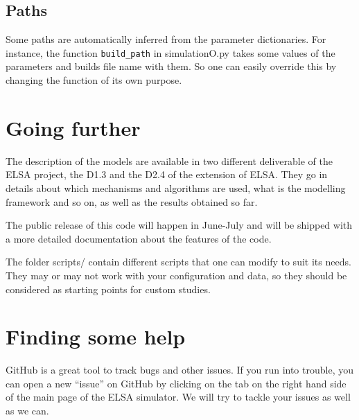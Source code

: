 \documentclass[12pt]{article}
\begin{document}
\subsection{Paths}
Some paths are automatically inferred from the parameter dictionaries. For instance, the function \verb|build_path| in simulationO.py takes some values of the parameters and builds file name with them. So one can easily override this by changing the function of its own purpose.


\section{Going further}

The description of the models are available in two different deliverable of the ELSA project, the D1.3 and the D2.4 of the extension of ELSA. They go in details about which mechanisms and algorithms are used, what is the modelling framework and so on, as well as the results obtained so far.  

The public release of this code will happen in June-July and will be shipped with a more detailed documentation about the features of the code.

The folder scripts/ contain different scripts that one can modify to suit its needs. They may or may not work with your configuration and data, so they should be considered as starting points for custom studies.


\section*{Finding some help}
GitHub is a great tool to track bugs and other issues. If you run into trouble, you can open a new ``issue'' on GitHub by clicking on the tab on the right hand side of the main page of the ELSA simulator. We will try to tackle your issues as well as we can.
\end{document}
